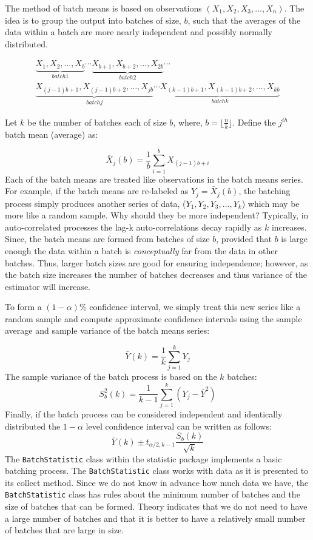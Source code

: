 \documentclass[
]{book}
\theoremstyle{definition}
\theoremstyle{definition}
\theoremstyle{definition}
\theoremstyle{definition}
\theoremstyle{remark}
\begin{document}
The method of batch means is based on observations \((X_{1}, X_{2}, X_{3}, \dots, X_{n})\). The idea is to group the output into batches of size, \(b\), such that the averages of the data within a batch are more nearly independent and possibly normally distributed.

\begin{multline*}
\underbrace{X_1, X_2, \ldots, X_b}_{batch 1} \cdots 
\underbrace{X_{b+1}, X_{b+2}, \ldots, X_{2b}}_{batch 2} \cdots \\
\underbrace{X_{(j-1)b+1}, X_{(j-1)b+2}, \ldots, X_{jb}}_{batch j}  \cdots 
\underbrace{X_{(k-1)b+1}, X_{(k-1)b+2}, \ldots, X_{kb}}_{batch k}
\end{multline*}

Let \(k\) be the number of batches each of size \(b\), where, \(b = \lfloor \frac{n}{k}\rfloor\). Define the \(j^{th}\) batch mean (average) as:

\[
\bar{X}_j(b) = \dfrac{1}{b} \sum_{i=1}^b X_{(j-1)b+i}
\]
Each of the batch means are treated like observations in the batch means series. For example, if the batch means are re-labeled as \(Y_j = \bar{X}_j(b)\), the batching process simply produces another series of data, (\(Y_1, Y_2, Y_3, \ldots, Y_k\)) which may be more like a random sample. Why should they be more independent? Typically, in auto-correlated processes the lag-k auto-correlations decay rapidly as \(k\) increases. Since, the batch means are formed from batches of size \(b\), provided that \(b\) is large enough the data within a batch is \emph{conceptually} far from the data in other batches. Thus, larger batch sizes are good for ensuring independence; however, as the batch size increases the number of batches decreases and thus variance of the estimator will increase.

To form a \((1 - \alpha)\)\% confidence interval, we simply treat this new series like a random sample and compute approximate confidence intervals using the sample average and sample variance of the batch means series:

\[
\bar{Y}(k) = \dfrac{1}{k} \sum_{j=1}^k Y_j
\]
The sample variance of the batch process is based on the \(k\) batches:
\[
S_b^2 (k) = \dfrac{1}{k - 1} \sum_{j=1}^k (Y_j - \bar{Y}^2)
\]
Finally, if the batch process can be considered independent and identically distributed the \(1-\alpha\) level confidence interval can be written as follows:
\[
\bar{Y}(k) \pm t_{\alpha/2, k-1} \dfrac{S_b (k)}{\sqrt{k}}
\]
The \texttt{BatchStatistic} class within the statistic package implements a basic batching process. The \texttt{BatchStatistic} class works with data as it is presented to its collect method. Since we do not know in advance how much data we have, the \texttt{BatchStatistic} class has rules about the minimum number of batches and the size of batches that can be formed. Theory indicates that we do not need to have a large number of batches and that it is better to have a relatively small number of batches that are large in size.
\end{document}
